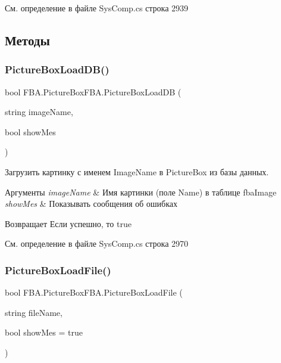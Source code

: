 См. определение в файле Sys\+Comp.\+cs строка 2939



\subsection{Методы}
\mbox{\label{class_f_b_a_1_1_picture_box_f_b_a_a07e337c0455cef7bca9b8c8559dfb4b9}} 
\subsubsection{\texorpdfstring{Picture\+Box\+Load\+D\+B()}{PictureBoxLoadDB()}}
{\footnotesize\ttfamily bool F\+B\+A.\+Picture\+Box\+F\+B\+A.\+Picture\+Box\+Load\+DB (\begin{DoxyParamCaption}\item[{string}]{image\+Name,  }\item[{bool}]{show\+Mes }\end{DoxyParamCaption})}



Загрузить картинку с именем Image\+Name в Picture\+Box из базы данных. 


\begin{DoxyParams}{Аргументы}
{\em image\+Name} & Имя картинки (поле Name) в таблице fba\+Image\\
\hline
{\em show\+Mes} & Показывать сообщения об ошибках\\
\hline
\end{DoxyParams}
\begin{DoxyReturn}{Возвращает}
Если успешно, то true
\end{DoxyReturn}


См. определение в файле Sys\+Comp.\+cs строка 2970

\mbox{\label{class_f_b_a_1_1_picture_box_f_b_a_a99bf326bea824ba19d792626139737f8}} 
\subsubsection{\texorpdfstring{Picture\+Box\+Load\+File()}{PictureBoxLoadFile()}}
{\footnotesize\ttfamily bool F\+B\+A.\+Picture\+Box\+F\+B\+A.\+Picture\+Box\+Load\+File (\begin{DoxyParamCaption}\item[{string}]{file\+Name,  }\item[{bool}]{show\+Mes = {\ttfamily true} }\end{DoxyParamCaption})}



